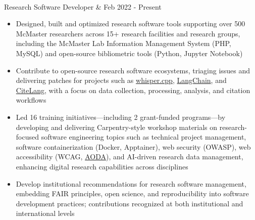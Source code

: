 \documentclass[letterpaper,11pt]{article} %
\newcommand{\resumeItem}[1]{\small{#1}\vspace{-5pt}}
\begin{document}
\vspace{5pt}
\begin{tabular*}
    \vspace{1pt}\\
    {Research Software Developer} & {\color{TextBlack} \small Feb 2022 - Present}\\
\end{tabular*}
\vspace{-10pt}
\begin{itemize}
    \item\resumeItem{Designed, built and optimized research software tools supporting over 500 McMaster researchers across 15+ research facilities and research groups, including the McMaster Lab Information Management System (PHP, MySQL) and open-source bibliometric tools (Python, Jupyter Notebook)}
    \item\resumeItem{Contribute to open-source research software ecosystems, triaging issues and delivering patches for projects such as \href{https://github.com/ggerganov/whisper.cpp}{whisper.cpp}, \href{https://github.com/langchain-ai/langchain}{LangChain}, and \href{https://github.com/vsoch/citelang}{CiteLang}, with a focus on data collection, processing, analysis, and citation workflows}
    \item\resumeItem{Led 16 training initiatives—including 2 grant-funded programs—by developing and delivering Carpentry-style workshop materials on research-focused software engineering topics such as technical project management, software containerization (Docker, Apptainer), web security (OWASP), web accessibility (WCAG, \href{https://www.aoda.ca/}{AODA}), and AI-driven research data management, enhancing digital research capabilities across disciplines}
    \item\resumeItem{Develop institutional recommendations for research software management, embedding FAIR principles, open science, and reproducibility into software development practices; contributions recognized at both institutional and international levels}
\end{itemize}
\end{document}
